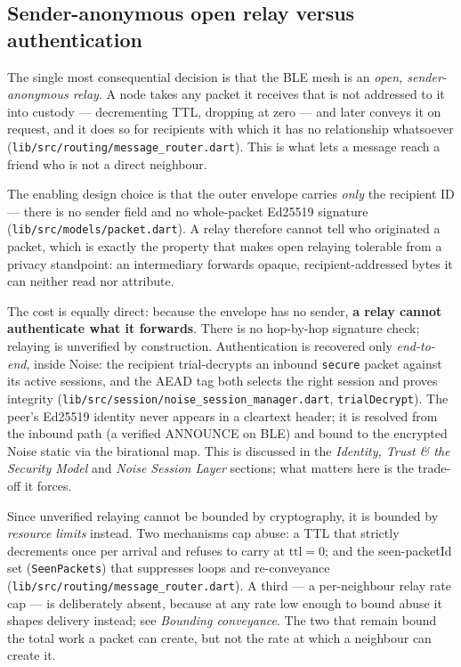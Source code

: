 \documentclass[11pt]{report}
\newcommand{\code}[1]{\texttt{\small #1}}
\begin{document}
\subsection{Sender-anonymous open relay versus authentication}

The single most consequential decision is that the BLE mesh is an \emph{open, sender-anonymous relay}. A node takes any packet it receives that is not addressed to it into custody --- decrementing TTL, dropping at zero --- and later conveys it on request, and it does so for recipients with which it has no relationship whatsoever (\code{lib/src/routing/message_router.dart}). This is what lets a message reach a friend who is not a direct neighbour.

The enabling design choice is that the outer envelope carries \emph{only} the recipient ID --- there is no sender field and no whole-packet Ed25519 signature (\code{lib/src/models/packet.dart}). A relay therefore cannot tell who originated a packet, which is exactly the property that makes open relaying tolerable from a privacy standpoint: an intermediary forwards opaque, recipient-addressed bytes it can neither read nor attribute.

The cost is equally direct: because the envelope has no sender, \textbf{a relay cannot authenticate what it forwards}. There is no hop-by-hop signature check; relaying is unverified by construction. Authentication is recovered only \emph{end-to-end}, inside Noise: the recipient trial-decrypts an inbound \code{secure} packet against its active sessions, and the AEAD tag both selects the right session and proves integrity (\code{lib/src/session/noise_session_manager.dart}, \code{trialDecrypt}). The peer's Ed25519 identity never appears in a cleartext header; it is resolved from the inbound path (a verified ANNOUNCE on BLE) and bound to the encrypted Noise static via the birational map. This is discussed in the \emph{Identity, Trust \& the Security Model} and \emph{Noise Session Layer} sections; what matters here is the trade-off it forces.

Since unverified relaying cannot be bounded by cryptography, it is bounded by \emph{resource limits} instead. Two mechanisms cap abuse: a TTL that strictly decrements once per arrival and refuses to carry at $\text{ttl} = 0$; and the seen-packetId set (\code{SeenPackets}) that suppresses loops and re-conveyance (\code{lib/src/routing/message_router.dart}). A third --- a per-neighbour relay rate cap --- is deliberately absent, because at any rate low enough to bound abuse it shapes delivery instead; see \emph{Bounding conveyance}. The two that remain bound the total work a packet can create, but not the rate at which a neighbour can create it.
\end{document}
